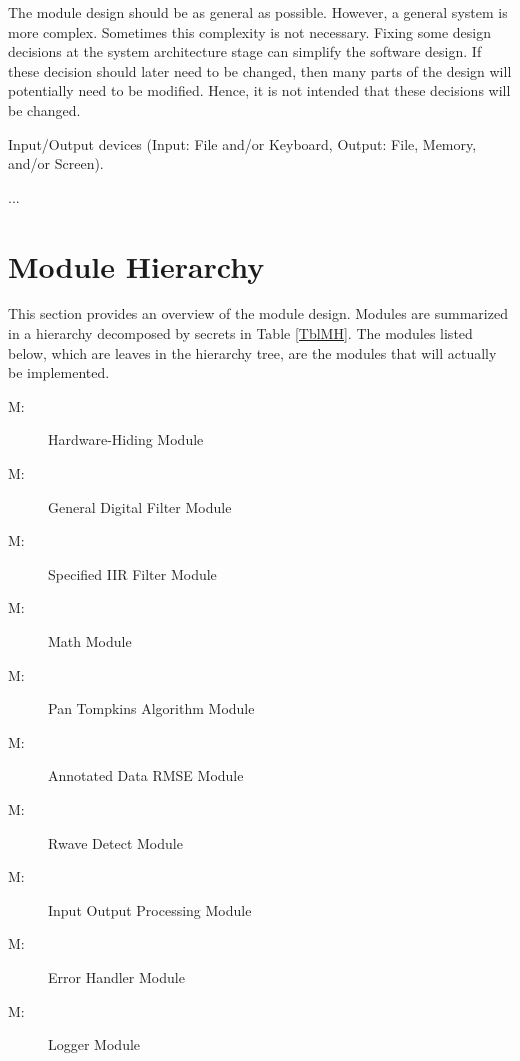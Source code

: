 \documentclass[12pt, titlepage]{article}
\newcounter{ucnum}
\newcommand{\uctheucnum}{UC\theucnum}
\newcounter{mnum}
\newcommand{\mthemnum}{M\themnum}
\begin{document}
The module design should be as general as possible. However, a general system is
more complex. Sometimes this complexity is not necessary. Fixing some design
decisions at the system architecture stage can simplify the software design. If
these decision should later need to be changed, then many parts of the design
will potentially need to be modified. Hence, it is not intended that these
decisions will be changed.

\begin{description}
\item[ \uctheucnum \label{ucIO}:] Input/Output devices
  (Input: File and/or Keyboard, Output: File, Memory, and/or Screen).
\item ...
\end{description}

\section{Module Hierarchy} \label{SecMH}

This section provides an overview of the module design. Modules are summarized
in a hierarchy decomposed by secrets in Table \ref{TblMH}. The modules listed
below, which are leaves in the hierarchy tree, are the modules that will
actually be implemented.

\begin{description}
\item [ \mthemnum \label{mHH}:] Hardware-Hiding Module
\item [ \mthemnum \label{mGDF}:] General Digital Filter
Module
\item [ \mthemnum \label{mSIIR}:] Specified IIR Filter
Module
\item [ \mthemnum \label{mMath}:] Math Module
\item [ \mthemnum \label{mAlg}:] Pan Tompkins Algorithm
Module
\item [ \mthemnum \label{mRMSE}:] Annotated Data RMSE
Module
\item [ \mthemnum \label{mRwave}:] Rwave Detect Module
\item [ \mthemnum \label{mIO}:] Input Output Processing
Module
\item [ \mthemnum \label{mError}:] Error Handler Module
\item [ \mthemnum \label{mLogger}:] Logger Module
\end{description}
\end{document}
